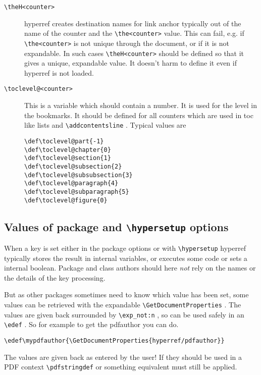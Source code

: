 \documentclass{article}
\newcommand*{\cs}[1]{%
  \texttt{\textbackslash #1}%
}
\newcommand*{\xpackage}[1]{\textsf{#1}}
\begin{document}
\begin{description}

\item[\cs{theH<counter>}]  \xpackage{hyperref} creates destination names for
link anchor typically out of the name of the counter and the \cs{the<counter>} value.
This can fail, e.g. if \cs{the<counter>} is not unique through the document,
or if it is not expandable. In such cases \cs{theH<counter>} should be defined so that
it gives a unique, expandable value. It doesn't harm to define it even if
\xpackage{hyperref} is not loaded.

\item[\cs{toclevel@<counter>}] This is a variable which should contain a number.
It is used for the level in the bookmarks. It should be defined for all counters
which are used in toc like lists and \cs{addcontentsline}. Typical values are

\begin{verbatim}
\def\toclevel@part{-1}
\def\toclevel@chapter{0}
\def\toclevel@section{1}
\def\toclevel@subsection{2}
\def\toclevel@subsubsection{3}
\def\toclevel@paragraph{4}
\def\toclevel@subparagraph{5}
\def\toclevel@figure{0}
\end{verbatim}

\end{description}

\subsection{Values of package and \cs{hypersetup} options}
When
a key is set either in the package options or with
\cs{hypersetup} \xpackage{hyperref} typically
stores the result in internal variables, or executes some
code or sets a internal boolean.
Package and class authors should here \emph{not} rely on
the names or the details of the key processing.

But as other packages sometimes need to know which value has been set,
some values can be retrieved with the expandable
\cs{GetDocumentProperties}. The values are given back
surrounded by \cs{exp\_not:n}, so can be used safely in an \cs{edef}.
So for example to get the pdfauthor you can do.

\begin{verbatim}
\edef\mypdfauthor{\GetDocumentProperties{hyperref/pdfauthor}}
\end{verbatim}

The values are given back as entered by the user! If they should be used in a PDF context
\cs{pdfstringdef} or something equivalent must still be applied.
\end{document}

